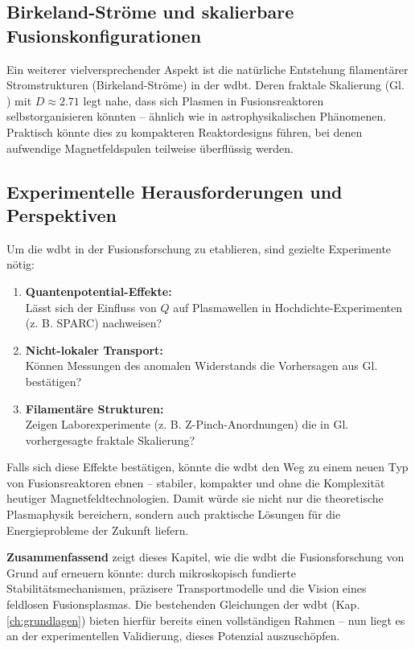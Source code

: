 \subsection{Birkeland-Ströme und skalierbare Fusionskonfigurationen}
Ein weiterer vielversprechender Aspekt ist die natürliche Entstehung filamentärer Stromstrukturen (Birkeland-Ströme) in der \gls{wdbt}. Deren fraktale Skalierung (Gl. ) mit
$D \approx 2.71$ legt nahe, dass sich Plasmen in Fusionsreaktoren selbstorganisieren könnten – ähnlich wie in astrophysikalischen Phänomenen. Praktisch könnte dies zu kompakteren
Reaktordesigns führen, bei denen aufwendige Magnetfeldspulen teilweise überflüssig werden.

\subsection{Experimentelle Herausforderungen und Perspektiven}
Um die \gls{wdbt} in der Fusionsforschung zu etablieren, sind gezielte Experimente nötig:

\begin{enumerate}
    \item \textbf{Quantenpotential-Effekte:}\\Lässt sich der Einfluss von $Q$ auf Plasmawellen in Hochdichte-Experimenten (z. B. SPARC) nachweisen?
    \item \textbf{Nicht-lokaler Transport:}\\Können Messungen des anomalen Widerstands die Vorhersagen aus Gl.  bestätigen?
    \item \textbf{Filamentäre Strukturen:}\\Zeigen Laborexperimente (z. B. Z-Pinch-Anordnungen) die in Gl.  vorhergesagte fraktale Skalierung?
\end{enumerate}

Falls sich diese Effekte bestätigen, könnte die \gls{wdbt} den Weg zu einem neuen Typ von Fusionsreaktoren ebnen – stabiler, kompakter und ohne die Komplexität heutiger
Magnetfeldtechnologien. Damit würde sie nicht nur die theoretische Plasmaphysik bereichern, sondern auch praktische Lösungen für die Energieprobleme der Zukunft liefern.

\textbf{Zusammenfassend} zeigt dieses Kapitel, wie die \gls{wdbt} die Fusionsforschung von Grund auf erneuern könnte: durch mikroskopisch fundierte Stabilitätsmechanismen, präzisere
Transportmodelle und die Vision eines feldlosen Fusionsplasmas. Die bestehenden Gleichungen der \gls{wdbt} (Kap. \ref{ch:grundlagen}) bieten hierfür bereits einen vollständigen Rahmen – nun liegt
es an der experimentellen Validierung, dieses Potenzial auszuschöpfen.
